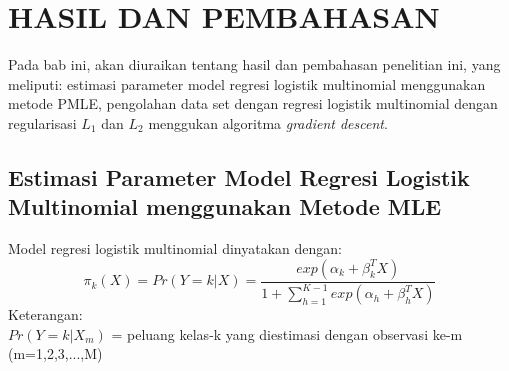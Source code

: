 \chapter{HASIL DAN PEMBAHASAN}

\hspace{\parindent}
Pada bab ini, akan diuraikan tentang hasil dan pembahasan penelitian ini, yang meliputi: estimasi parameter model regresi logistik multinomial menggunakan metode PMLE, pengolahan data set dengan regresi logistik multinomial dengan regularisasi $L_1$ dan $L_2$ menggukan algoritma \textit{gradient descent}.
\section{Estimasi Parameter Model Regresi Logistik Multinomial menggunakan Metode MLE }
Model regresi logistik multinomial dinyatakan dengan:
\begin{equation}\label{eqn:pi_k}    
	\pi_k(X)=Pr(Y=k|X)=\frac{exp(\alpha_k+\beta_k^T X)}{1+\sum_{h=1}^{K-1}exp(\alpha_h+\beta_h^T X)}
\end{equation}
Keterangan:\\
$Pr(Y=k|X_m)$ = peluang kelas-k yang diestimasi dengan observasi ke-m (m=1,2,3,...,M)

